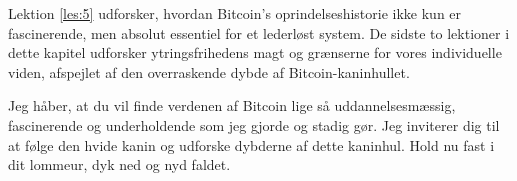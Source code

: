 Lektion \ref{les:5} udforsker, hvordan Bitcoin's oprindelseshistorie ikke kun er 
fascinerende, men absolut essentiel for et lederløst system. De sidste to 
lektioner i dette kapitel udforsker ytringsfrihedens magt og grænserne for vores 
individuelle viden, afspejlet af den overraskende dybde af Bitcoin-kaninhullet.

Jeg håber, at du vil finde verdenen af Bitcoin lige så uddannelsesmæssig, 
fascinerende og underholdende som jeg gjorde og stadig gør. Jeg inviterer dig 
til at følge den hvide kanin og udforske dybderne af dette kaninhul. Hold nu 
fast i dit lommeur, dyk ned og nyd faldet.
